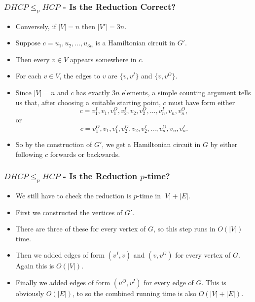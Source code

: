 \documentclass[handout]{beamer}
\begin{document}
\begin{frame}
\frametitle{$DHCP\leq_p HCP$ - Is the Reduction Correct?}
\begin{itemize}
\item Conversely, if $|V|=n$ then $|V'|=3n$. 
\item Suppose $c=u_1,u_2,\ldots,u_{3n}$ is a Hamiltonian circuit in $G'$. 
\item Then every $v\in V$ appears somewhere in $c$. 
\item For each $v\in V$, the edges to $v$ are $\{v,v^I\}$ and $\{v,v^O\}$. 
\item Since $|V|=n$ and $c$ has exactly $3n$ elements, a simple counting argument tells us that, after choosing a suitable starting point, $c$ must have form either  \begin{equation*}c= v^I_1,v_1, v^O_1, v_2^I, v_2, v_2^O,\ldots,v_n^I,v_n,v_n^O,\end{equation*} or \begin{equation*}c=v^O_1,v_1, v^I_1, v_2^O, v_2, v_2^I,\ldots,v_n^O,v_n,v_n^I.\end{equation*} 
\item So by the construction of $G'$, we get a Hamiltonian circuit in $G$ by either following $c$ forwards or backwards.
\end{itemize} 
\end{frame}

\begin{frame}
\frametitle{$DHCP\leq_p HCP$ - Is the Reduction $p$-time?}
\begin{itemize}
\item We still have to check the reduction is $p$-time in $|V|+|E|$. 
\vspace{0.5cm}
\item First we constructed the vertices of $G'$. 
\vspace{0.5cm}
\item There are three of these for every vertex of $G$, so this step runs in $O(|V|)$ time. 
\vspace{0.5cm}
\item Then we added edges of form $(v^I,v)$ and $(v,v^O)$ for every vertex of $G$. Again this is $O(|V|)$.
\vspace{0.5cm}
\item Finally we added edges of form $(u^O,v^I)$ for every edge of $G$. This is obviously $O(|E|)$, to so the combined running time is also $O(|V|+|E|)$.
\end{itemize} 
\end{frame}
\end{document}
